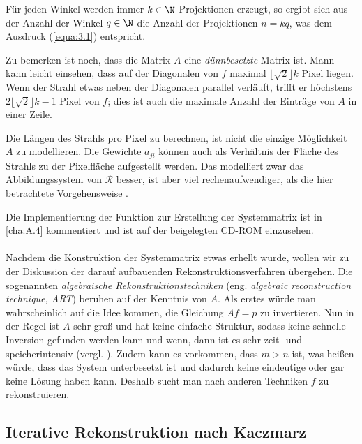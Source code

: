 Für jeden Winkel werden immer $k \in \N$ Projektionen erzeugt, so ergibt sich aus der Anzahl der Winkel $q \in \N$ die Anzahl der Projektionen $n = kq$, was dem Ausdruck (\ref{equa:3.1}) entspricht.   

Zu bemerken ist noch, dass die Matrix $A$ eine \textit{dünnbesetzte} Matrix ist. Mann kann leicht einsehen, dass auf der Diagonalen von $f$ maximal $\lfloor\sqrt{2}\rfloor k$ Pixel liegen. Wenn der Strahl etwas neben der Diagonalen parallel verläuft, trifft er höchstens $2\lfloor\sqrt{2}\rfloor k - 1$ Pixel von $f$; dies ist auch die maximale Anzahl der Einträge von $A$ in einer Zeile.

\begin{Bemerkung}
	Die Längen des Strahls pro Pixel zu berechnen, ist nicht die einzige Möglichkeit $A$ zu modellieren. Die Gewichte $a_{ji}$ können auch als Verhältnis der Fläche des Strahls zu der Pixelfläche aufgestellt werden. Das modelliert zwar das Abbildungssystem von $\mathcal{R}$ besser, ist aber viel rechenaufwendiger, als die hier betrachtete Vorgehensweise \cite[S. 141]{Zeng09}.
\end{Bemerkung}
Die Implementierung der Funktion zur Erstellung der Systemmatrix ist in \ref{cha:A.4} kommentiert und ist auf der beigelegten CD-ROM einzusehen.\\\\

Nachdem die Konstruktion der Systemmatrix etwas erhellt wurde, wollen wir zu der Diskussion der darauf aufbauenden Rekonstruktionsverfahren übergehen. Die sogenannten \textit{algebraische Rekonstruktionstechniken} (eng. \textit{algebraic reconstruction technique, ART}) beruhen auf der Kenntnis von $A$. Als erstes würde man wahrscheinlich auf die Idee kommen, die Gleichung $Af = p$ zu invertieren. Nun in der Regel ist $A$ sehr groß und hat keine einfache Struktur, sodass keine schnelle Inversion gefunden werden kann und wenn, dann ist es sehr zeit- und speicherintensiv (vergl. \cite[S. 157]{Burg91}). Zudem kann es vorkommen, dass $m > n$ ist, was heißen würde, dass das System unterbesetzt ist und dadurch keine eindeutige oder gar keine Lösung haben kann. Deshalb sucht man nach anderen Techniken $f$ zu rekonstruieren.

\subsection{Iterative Rekonstruktion nach Kaczmarz}
\label{cha:3.2.1}

